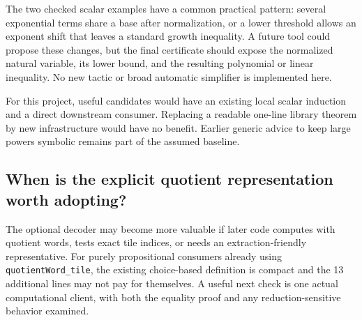 \documentclass[11pt]{article}
\newcommand{\code}[1]{\ifmmode\text{\ttfamily\detokenize{#1}}\else\nolinkurl{#1}\fi}
\begin{document}
The two checked scalar examples have a common practical pattern: several exponential
terms share a base after normalization, or a lower threshold allows an exponent
shift that leaves a standard growth inequality. A future tool could propose these
changes, but the final certificate should expose the normalized natural variable,
its lower bound, and the resulting polynomial or linear inequality. No new tactic
or broad automatic simplifier is implemented here.

For this project, useful candidates would have an existing local scalar induction
and a direct downstream consumer. Replacing a readable one-line library theorem by
new infrastructure would have no benefit. Earlier generic advice to keep large
powers symbolic remains part of the assumed baseline.

\subsection{When is the explicit quotient representation worth adopting?}

The optional decoder may become more valuable if later code computes with quotient
words, tests exact tile indices, or needs an extraction-friendly representative.
For purely propositional consumers already using \code{quotientWord_tile}, the
existing choice-based definition is compact and the 13 additional lines may not
pay for themselves. A useful next check is one actual computational client, with
both the equality proof and any reduction-sensitive behavior examined.
\end{document}
